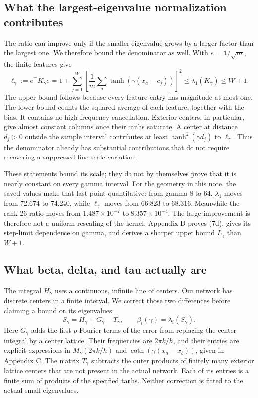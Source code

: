 \documentclass[11pt]{article}
\begin{document}
\subsection{What the largest-eigenvalue normalization contributes}

The ratio can improve only if the smaller eigenvalue grows by a larger factor than the largest one. We therefore bound the denominator as well. With \(e=\mathbf1/\sqrt m\), the finite features give
\[
\ell_\gamma:=e^\top K_\gamma e
=1+\sum_{j=1}^{W}\left[\frac1m\sum_a\tanh(\gamma(x_a-c_j))\right]^2
\le\lambda_1(K_\gamma)\le W+1.
\tag{7d}
\]
The upper bound follows because every feature entry has magnitude at most one. The lower bound counts the squared average of each feature, together with the bias. It contains no high-frequency cancellation. Exterior centers, in particular, give almost constant columns once their tanhs saturate. A center at distance \(d_j>0\) outside the sample interval contributes at least \(\tanh^2(\gamma d_j)\) to \(\ell_\gamma\). Thus the denominator already has substantial contributions that do not require recovering a suppressed fine-scale variation.

These statements bound its scale; they do not by themselves prove that it is nearly constant on every gamma interval. For the geometry in this note, the saved values make that last point quantitative: from gamma 8 to 64, \(\lambda_1\) moves from 72.674 to 74.240, while \(\ell_\gamma\) moves from 66.823 to 68.316. Meanwhile the rank-26 ratio moves from \(1.487\times10^{-7}\) to \(8.357\times10^{-4}\). The large improvement is therefore not a uniform rescaling of the kernel. Appendix D proves (7d), gives its step-limit dependence on gamma, and derives a sharper upper bound \(L_\gamma\) than \(W+1\).

\subsection{What beta, delta, and tau actually are}

The integral \(H_\gamma\) uses a continuous, infinite line of centers. Our network has discrete centers in a finite interval. We correct those two differences before claiming a bound on its eigenvalues:
\[
\boxed{S_\gamma=H_\gamma+G_\gamma-T_\gamma,
\qquad \beta_i(\gamma)=\lambda_i(S_\gamma).}
\tag{8}
\]
Here \(G_\gamma\) adds the first \(p\) Fourier terms of the error from replacing the center integral by a center lattice. Their frequencies are \(2\pi k/h\), and their entries are explicit expressions in \(M_\gamma(2\pi k/h)\) and \(\coth(\gamma(x_a-x_b))\), given in Appendix C. The matrix \(T_\gamma\) subtracts the outer products of finitely many exterior lattice centers that are not present in the actual network. Each of its entries is a finite sum of products of the specified tanhs. Neither correction is fitted to the actual small eigenvalues.
\end{document}
